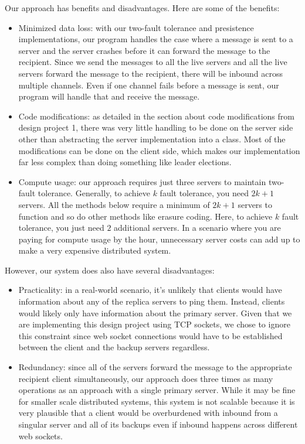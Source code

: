 \documentclass[
	a4paper, %
	10pt, %
	unnumberedsections, %
	twoside, %
]{LTJournalArticle}
\begin{document}
Our approach has benefits and disadvantages. Here are some of the benefits: 
\begin{itemize}
    \item Minimized data loss: with our two-fault tolerance and presistence implementations, our program handles the case where a message is sent to a server and the server crashes before it can forward the message to the recipient. Since we send the messages to all the live servers and all the live servers forward the message to the recipient, there will be inbound across multiple channels. Even if one channel fails before a message is sent, our program will handle that and receive the message.
    \item Code modifications: as detailed in the section about code modifications from design project 1, there was very little handling to be done on the server side other than abstracting the server implementation into a class. Most of the modifications can be done on the client side, which makes our implementation far less complex than doing something like leader elections. 
    \item Compute usage: our approach requires just three servers to maintain two-fault tolerance. Generally, to achieve $k$ fault tolerance, you need $2k + 1$ servers. All the methods below require a minimum of $2k + 1$ servers to function and so do other methods like erasure coding. Here, to achieve $k$ fault tolerance, you just need $2$ additional servers. In a scenario where you are paying for compute usage by the hour, unnecessary server costs can add up to make a very expensive distributed system. 
\end{itemize}

However, our system does also have several disadvantages: 
\begin{itemize}
    \item Practicality: in a real-world scenario, it's unlikely that clients would have information about any of the replica servers to ping them. Instead, clients would likely only have information about the primary server. Given that we are implementing this design project using TCP sockets, we chose to ignore this constraint since web socket connections would have to be established between the client and the backup servers regardless. 
    \item Redundancy: since all of the servers forward the message to the appropriate recipient client simultaneously, our approach does three times as many operations as an approach with a single primary server. While it may be fine for smaller scale distributed systems, this system is not scalable because it is very plausible that a client would be overburdened with inbound from a singular server and all of its backups even if inbound happens across different web sockets. 
\end{itemize}
\end{document}
